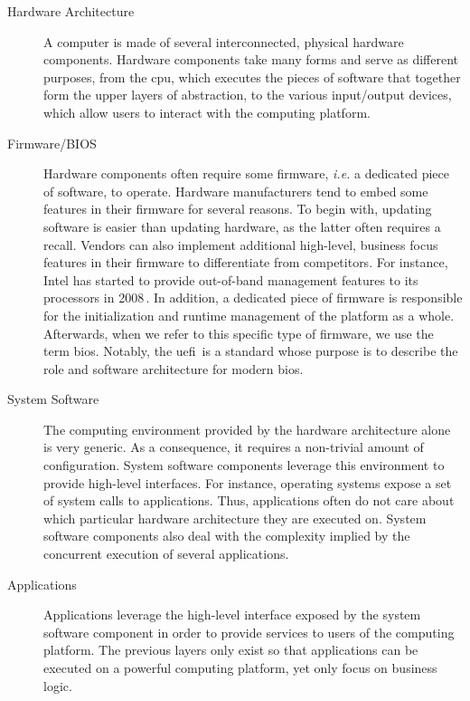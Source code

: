 \begin{description}
\item [Hardware Architecture]
  A computer is made of several inter\-connected, physical hardware components.
  Hardware components take many forms and serve as different purposes, from the
  \ac{cpu}, which executes the pieces of software that together form the upper
  layers of abstraction, to the various input/output devices, which allow users
  to interact with the computing platform.
\item [Firmware/BIOS]
  Hardware components often require some firm\-ware, \emph{i.e.} a dedicated
  piece of software, to operate.
  Hardware manufacturers tend to embed some features in their firmware for
  several reasons.
  To begin with, updating software is easier than updating hardware, as the
  latter often requires a recall.
  Vendors can also implement additional high-level, business focus features in
  their firmware to differentiate from competitors.
  For instance, Intel has started to provide out-of-band management features to
  its processors in 2008\,\cite{ruan2014me}.
  In addition, a dedicated piece of firmware is responsible for the
  initialization and runtime management of the platform as a whole.
  Afterwards, when we refer to this specific type of firmware, we use the term
  \ac{bios}.
  Notably, the \ac{uefi}\,\cite{uefi2017uefi} is a standard whose purpose is to
  describe the role and software architecture for modern \ac{bios}.
\item [System Software]
  The computing environment provided by the hardware architecture alone is very
  generic.
  As a consequence, it requires a non-trivial amount of configuration.
  System software components leverage this environment to provide high-level
  interfaces.
  For instance, operating systems expose a set of system calls to applications.
  Thus, applications often do not care about which particular hardware
  architecture they are executed on.
  System software components also deal with the complexity implied by the
  concurrent execution of several applications.
\item [Applications]
  Applications leverage the high-level interface exposed by the system software
  component in order to provide services to users of the computing platform.
  The previous layers only exist so that applications can be executed on a
  powerful computing platform, yet only focus on business logic.
\end{description}


